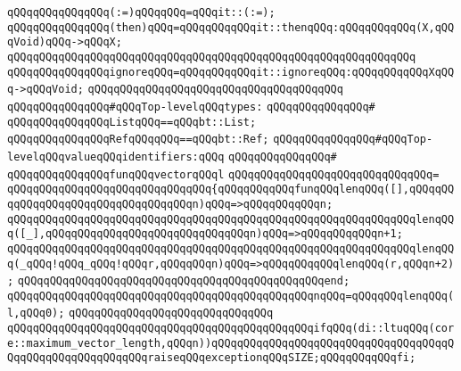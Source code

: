 \verb|qQQqqQQqqQQqqQQq(:=)qQQqqQQq=qQQqit::(:=);|\newline
\newline
\verb|qQQqqQQqqQQqqQQq(then)qQQq=qQQqqQQqqQQqit::thenqQQq:qQQqqQQqqQQq(X,qQQqVoid)qQQq->qQQqX;|\newline
\verb|qQQqqQQqqQQqqQQqqQQqqQQqqQQqqQQqqQQqqQQqqQQqqQQqqQQqqQQqqQQqqQQq|\newline
\newline
\verb|qQQqqQQqqQQqqQQqignoreqQQq=qQQqqQQqqQQqit::ignoreqQQq:qQQqqQQqqQQqXqQQq->qQQqVoid;|\newline
\verb|qQQqqQQqqQQqqQQqqQQqqQQqqQQqqQQqqQQqqQQq|\newline
\newline
\verb|qQQqqQQqqQQqqQQq#qQQqTop-levelqQQqtypes:|\newline
\verb|qQQqqQQqqQQqqQQq#|\newline
\verb|qQQqqQQqqQQqqQQqListqQQq==qQQqbt::List;|\newline
\verb|qQQqqQQqqQQqqQQqRefqQQqqQQq==qQQqbt::Ref;|\newline
\newline
\newline
\verb|qQQqqQQqqQQqqQQq#qQQqTop-levelqQQqvalueqQQqidentifiers:qQQq|\newline
\verb|qQQqqQQqqQQqqQQq#|\newline
\verb|qQQqqQQqqQQqqQQqfunqQQqvectorqQQql|\newline
\verb|qQQqqQQqqQQqqQQqqQQqqQQqqQQqqQQq=|\newline
\verb|qQQqqQQqqQQqqQQqqQQqqQQqqQQqqQQq{qQQqqQQqqQQqfunqQQqlenqQQq([],qQQqqQQqqQQqqQQqqQQqqQQqqQQqqQQqqQQqn)qQQq=>qQQqqQQqqQQqn;|\newline
\verb|qQQqqQQqqQQqqQQqqQQqqQQqqQQqqQQqqQQqqQQqqQQqqQQqqQQqqQQqqQQqqQQqlenqQQq([_],qQQqqQQqqQQqqQQqqQQqqQQqqQQqqQQqn)qQQq=>qQQqqQQqqQQqn+1;|\newline
\verb|qQQqqQQqqQQqqQQqqQQqqQQqqQQqqQQqqQQqqQQqqQQqqQQqqQQqqQQqqQQqqQQqlenqQQq(_qQQq!qQQq_qQQq!qQQqr,qQQqqQQqn)qQQq=>qQQqqQQqqQQqlenqQQq(r,qQQqn+2);|\newline
\verb|qQQqqQQqqQQqqQQqqQQqqQQqqQQqqQQqqQQqqQQqqQQqqQQqend;|\newline
\newline
\verb|qQQqqQQqqQQqqQQqqQQqqQQqqQQqqQQqqQQqqQQqqQQqqQQqnqQQq=qQQqqQQqlenqQQq(l,qQQq0);|\newline
\verb|qQQqqQQqqQQqqQQqqQQqqQQqqQQqqQQq|\newline
\verb|qQQqqQQqqQQqqQQqqQQqqQQqqQQqqQQqqQQqqQQqqQQqqQQqifqQQq(di::ltuqQQq(core::maximum_vector_length,qQQqn))qQQqqQQqqQQqqQQqqQQqqQQqqQQqqQQqqQQqqQQqqQQqqQQqqQQqqQQqqQQqraiseqQQqexceptionqQQqSIZE;qQQqqQQqqQQqfi;|\newline
